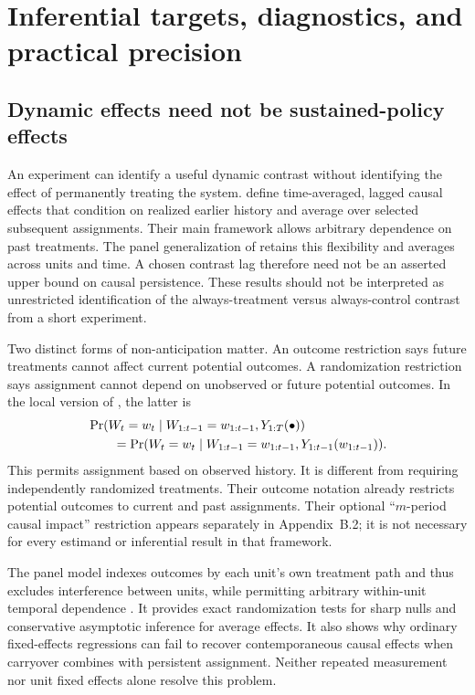 \section{Inferential targets, diagnostics, and practical precision}\label{sec:inference}

\subsection{Dynamic effects need not be sustained-policy effects}

An experiment can identify a useful dynamic contrast without identifying the effect of permanently treating the system. \citet{bojinovshephard2019} define time-averaged, lagged causal effects that condition on realized earlier history and average over selected subsequent assignments. Their main framework allows arbitrary dependence on past treatments. The panel generalization of \citet{bojinovpanel2021} retains this flexibility and averages across units and time. A chosen contrast lag therefore need not be an asserted upper bound on causal persistence. These results should not be interpreted as unrestricted identification of the always-treatment versus always-control contrast from a short experiment.

Two distinct forms of non-anticipation matter. An outcome restriction says future treatments cannot affect current potential outcomes. A randomization restriction says assignment cannot depend on unobserved or future potential outcomes. In the local version of \citet[Assumption~2, p.~6]{bojinovshephard2019}, the latter is
\begin{align}
 &\Pr(W_t=w_t\mid W_{1:t-1}=w_{1:t-1},Y_{1:T}(\bullet))\notag\\
 &\qquad=\Pr(W_t=w_t\mid W_{1:t-1}=w_{1:t-1},
 Y_{1:t-1}(w_{1:t-1})).\label{eq:assignment-nonanticipation}
\end{align}
This permits assignment based on observed history. It is different from requiring independently randomized treatments. Their outcome notation already restricts potential outcomes to current and past assignments. Their optional ``$m$-period causal impact'' restriction appears separately in Appendix~B.2; it is not necessary for every estimand or inferential result in that framework.

The panel model indexes outcomes by each unit's own treatment path and thus excludes interference between units, while permitting arbitrary within-unit temporal dependence \citep[Definition~1 and Assumption~1, p.~5]{bojinovpanel2021}. It provides exact randomization tests for sharp nulls and conservative asymptotic inference for average effects. It also shows why ordinary fixed-effects regressions can fail to recover contemporaneous causal effects when carryover combines with persistent assignment. Neither repeated measurement nor unit fixed effects alone resolve this problem.

